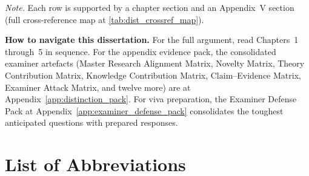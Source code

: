 \documentclass[12pt,a4paper,oneside]{report}
\begin{document}
\vspace{0.3em}\noindent\textit{Note.} Each row is supported by a chapter section and an Appendix~V section (full cross-reference map at \autoref{tab:dist_crossref_map}).

\vspace{0.5em}
\noindent\textbf{How to navigate this dissertation.} For the full argument, read Chapters~1 through~5 in sequence. For the appendix evidence pack, the consolidated examiner artefacts (Master Research Alignment Matrix, Novelty Matrix, Theory Contribution Matrix, Knowledge Contribution Matrix, Claim--Evidence Matrix, Examiner Attack Matrix, and twelve more) are at Appendix~\ref{app:distinction_pack}. For viva preparation, the Examiner Defense Pack at Appendix~\ref{app:examiner_defense_pack} consolidates the toughest anticipated questions with prepared responses.


\clearpage
\tableofcontents

\clearpage
{}
{}
\listoftables

\clearpage
{}
{}
{\setlength{\baselineskip}{12pt}\linespread{0.9}\selectfont
\listoffigures
\par}

\cleardoublepage   %

\chapter*{List of Abbreviations}
\end{document}
